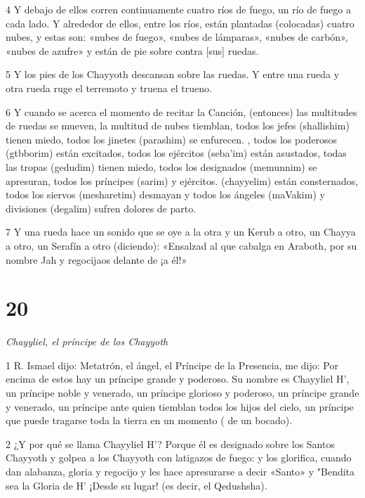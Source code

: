\par 4 Y debajo de ellos corren continuamente cuatro ríos de fuego, un río de fuego a cada lado. Y alrededor de ellos, entre los ríos, están plantadas (colocadas) cuatro nubes, y estas son: «nubes de fuego», «nubes de lámparas», «nubes de carbón», «nubes de azufre» y están de pie sobre contra [sus] ruedas.

\par 5 Y los pies de los Chayyoth descansan sobre las ruedas. Y entre una rueda y otra rueda ruge el terremoto y truena el trueno.

\par 6 Y cuando se acerca el momento de recitar la Canción, (entonces) las multitudes de ruedas se mueven, la multitud de nubes tiemblan, todos los jefes (shallishim) tienen miedo, todos los jinetes (parashim) se enfurecen. , todos los poderosos (gtbborim) están excitados, todos los ejércitos (seba'im) están asustados, todas las tropas (gedudim) tienen miedo, todos los designados (memunnim) se apresuran, todos los príncipes (sarim) y ejércitos. (chayyelim) están consternados, todos los siervos (mesharetim) desmayan y todos los ángeles (maVakim) y divisiones (degalim) sufren dolores de parto.

\par 7 Y una rueda hace un sonido que se oye a la otra y un Kerub a otro, un Chayya a otro, un Serafín a otro (diciendo): «Ensalzad al que cabalga en Araboth, por su nombre Jah y regocijaos delante de ¡a él!»

\chapter{20}

\par \textit{Chayyliel, el príncipe de los Chayyoth}

\par 1 R. Ismael dijo: Metatrón, el ángel, el Príncipe de la Presencia, me dijo: Por encima de estos hay un príncipe grande y poderoso. Su nombre es Chayyliel H', un príncipe noble y venerado, un príncipe glorioso y poderoso, un príncipe grande y venerado, un príncipe ante quien tiemblan todos los hijos del cielo, un príncipe que puede tragarse toda la tierra en un momento ( de un bocado).

\par 2 ¿Y por qué se llama Chayyliel H'? Porque él es designado sobre los Santos Chayyoth y golpea a los Chayyoth con latigazos de fuego: y los glorifica, cuando dan alabanza, gloria y regocijo y les hace apresurarse a decir «Santo» y "Bendita sea la Gloria de H' ¡Desde su lugar! (es decir, el Qedushsha).

